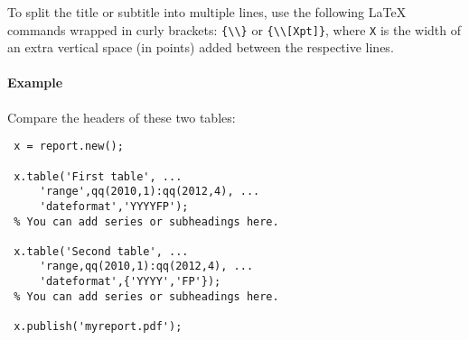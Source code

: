  To split the title or subtitle into multiple lines, use the following
 LaTeX commands wrapped in curly brackets:
 \texttt{\{\textbackslash{}\textbackslash{}\}} or
 \texttt{\{\textbackslash{}\textbackslash{}{[}Xpt{]}\}}, where \texttt{X}
 is the width of an extra vertical space (in points) added between the
 respective lines.
 
 \paragraph{Example}
 
 Compare the headers of these two tables:
 
 \begin{verbatim}
 x = report.new();
 
 x.table('First table', ...
     'range',qq(2010,1):qq(2012,4), ...
     'dateformat','YYYYFP');
 % You can add series or subheadings here.
 
 x.table('Second table', ...
     'range,qq(2010,1):qq(2012,4), ...
     'dateformat',{'YYYY','FP'});
 % You can add series or subheadings here.
 
 x.publish('myreport.pdf');
 \end{verbatim}


